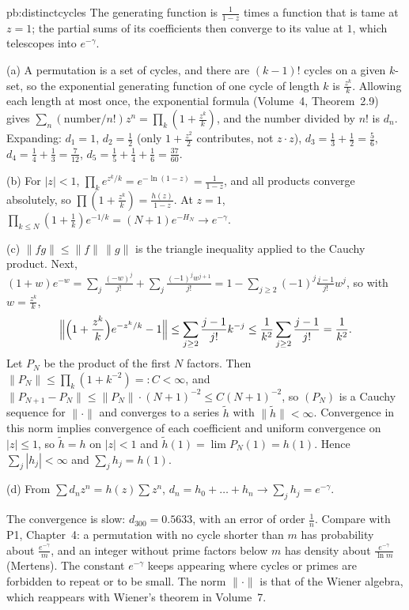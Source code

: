 \begin{solution}{pb:distinctcycles}
\idea The generating function is $\frac1{1-z}$ times a function that is tame at $z=1$; the partial sums of its coefficients then converge to its value at $1$, which
telescopes into $e^{-\gamma}$.

\writeup (a) A permutation is a set of cycles, and there are $(k-1)!$ cycles on a given $k$-set, so the exponential generating function of one cycle of length $k$
is $\frac{z^k}k$. Allowing each length at most once, the exponential formula (Volume~4, Theorem~2.9) gives $\sum_n(\text{number}/n!)z^n=\prod_k(1+\frac{z^k}k)$, and the number divided
by $n!$ is $d_n$. Expanding: $d_1=1$, $d_2=\frac12$ (only $1+\frac{z^2}2$ contributes, not $z\cdot z$), $d_3=\frac13+\frac12=\frac56$, $d_4=\frac14+\frac13=\frac7{12}$, $d_5=\frac15+\frac14+\frac16=\frac{37}{60}$.

(b) For $|z|<1$, $\prod_ke^{z^k/k}=e^{-\ln(1-z)}=\frac1{1-z}$, and all products converge absolutely, so $\prod(1+\frac{z^k}k)=\frac{h(z)}{1-z}$. At $z=1$,
$\prod_{k\le N}(1+\frac1k)e^{-1/k}=(N+1)e^{-H_N}\to e^{-\gamma}$.

(c) $\|fg\|\le\|f\|\,\|g\|$ is the triangle inequality applied to the Cauchy product. Next, $(1+w)e^{-w}=\sum_j\frac{(-w)^j}{j!}+\sum_j\frac{(-1)^jw^{j+1}}{j!}=1-\sum_{j\ge2}(-1)^j\frac{j-1}{j!}w^j$,
so with $w=\frac{z^k}k$,
\[
\Bigl\|\Bigl(1+\frac{z^k}k\Bigr)e^{-z^k/k}-1\Bigr\|\le\sum_{j\ge2}\frac{j-1}{j!}k^{-j}\le\frac1{k^2}\sum_{j\ge2}\frac{j-1}{j!}=\frac1{k^2}.
\]
Let $P_N$ be the product of the first $N$ factors. Then $\|P_N\|\le\prod_k(1+k^{-2})=:C<\infty$, and $\|P_{N+1}-P_N\|\le\|P_N\|\cdot(N+1)^{-2}\le C(N+1)^{-2}$, so $(P_N)$ is a Cauchy
sequence for $\|\cdot\|$ and converges to a series $\tilde h$ with $\|\tilde h\|<\infty$. Convergence in this norm implies convergence of each coefficient and uniform convergence on
$|z|\le1$, so $\tilde h=h$ on $|z|<1$ and $\tilde h(1)=\lim P_N(1)=h(1)$. Hence $\sum_j|h_j|<\infty$ and $\sum_jh_j=h(1)$.

(d) From $\sum d_nz^n=h(z)\sum z^n$, $d_n=h_0+\dots+h_n\to\sum_jh_j=e^{-\gamma}$.

\leads The convergence is slow: $d_{300}=0.5633$, with an error of order $\frac1n$. Compare with P1, Chapter~4: a permutation with no cycle shorter than $m$ has probability
about $\frac{e^{-\gamma}}m$, and an integer without prime factors below $m$ has density about $\frac{e^{-\gamma}}{\ln m}$ (Mertens). The constant $e^{-\gamma}$ keeps appearing where
cycles or primes are forbidden to repeat or to be small. The norm $\|\cdot\|$ is that of the Wiener algebra, which reappears with Wiener's theorem in Volume~7.
\end{solution}

